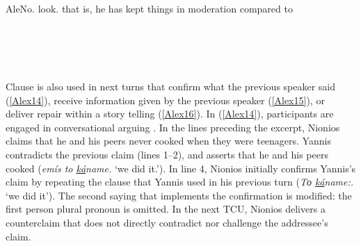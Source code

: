 \documentclass[output=paper]{LSP/langsci}
\begin{document}
\begin{Transcript}[FS {>}{>\hspace{0.2in}}]{Ale}{No. look. that is, he has kept things in moderation compared to}
\label{Alex13}
\\
\\	
\\ 
  \\
\\ 
\end{Transcript}

Clause  is also used in next turns that confirm what the previous speaker said (\ref{Alex14}), receive information given by the previous speaker (\ref{Alex15}), or deliver repair within a story telling (\ref{Alex16}). In (\ref{Alex14}), participants are engaged in conversational arguing \citep{Muntigl98}. In the lines preceding the excerpt, Nionios claims that he and his peers never cooked when they were teenagers. Yannis contradicts the previous claim (lines 1--2), and asserts that he and his peers cooked (\textit{emís to \underline{ká}name.} `we did it.'). In line 4, Nionios initially confirms Yannis’s claim by repeating the clause that Yannis used in his previous turn (\textit{Το \underline{ká}name:.} `we did it'). The second saying that implements the confirmation is modified: the first person plural pronoun is omitted. In the next TCU, Nionios delivers a counterclaim that does not directly contradict nor challenge the addressee’s claim. 
\end{document}
